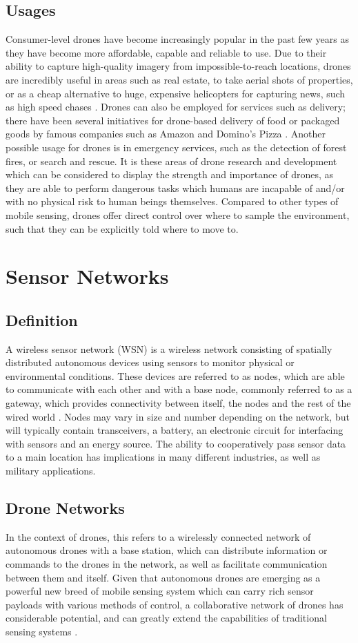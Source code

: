 		\subsection{Usages}
		Consumer-level drones have become increasingly popular in the past few years as they have become more affordable, capable and reliable to use. Due to their ability to capture high-quality imagery from impossible-to-reach locations, drones are incredibly useful in areas such as real estate, to take aerial shots of properties, or as a cheap alternative to huge, expensive helicopters for capturing news, such as high speed chases \cite{josephdussault2014}. Drones can also be employed for services such as delivery; there have been several initiatives for drone-based delivery of food or packaged goods by famous companies such as Amazon and Domino's Pizza \cite{marcusfaires2015}. Another possible usage for drones is in emergency services, such as the detection of forest fires, or search and rescue. It is these areas of drone research and development which can be considered to display the strength and importance of drones, as they are able to perform dangerous tasks which humans are incapable of and/or with no physical risk to human beings themselves. Compared to other types of mobile sensing, drones offer direct control over where to sample the environment, such that they can be explicitly told where to move to.
	\section{Sensor Networks}
		\subsection{Definition}
		A wireless sensor network (WSN) is a wireless network consisting of spatially distributed autonomous devices using sensors to monitor physical or environmental conditions. These devices are referred to as nodes, which are able to communicate with each other and with a base node, commonly referred to as a gateway, which provides connectivity between itself, the nodes and the rest of the wired world \cite{ nationalinstruments2012}. Nodes may vary in size and number depending on the network, but will typically contain transceivers, a battery, an electronic circuit for interfacing with sensors and an energy source.  The ability to cooperatively pass sensor data to a main location has implications in many different industries, as well as military applications.
		\subsection{Drone Networks}
		In the context of drones, this refers to a wirelessly connected network of autonomous drones with a base station, which can distribute information or commands to the drones in the network, as well as facilitate communication between them and itself.  Given that autonomous drones are emerging as a powerful new breed of mobile sensing system which can carry rich sensor payloads with various methods of control, a collaborative network of drones has considerable potential, and can greatly extend the capabilities of traditional sensing systems \cite{lucamottola2014}. 
